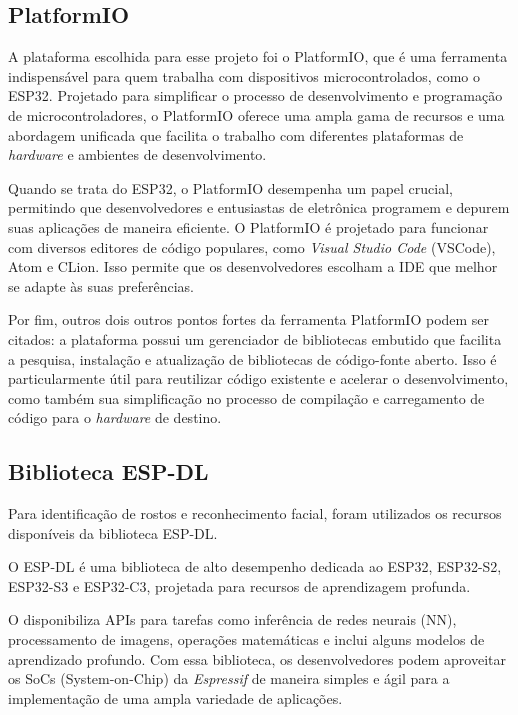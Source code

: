 \subsection{PlatformIO}\label{sec:platformio}

A plataforma escolhida para esse projeto foi o PlatformIO, 
que é uma ferramenta indispensável para quem trabalha com dispositivos 
microcontrolados, como o ESP32. Projetado para simplificar o processo 
de desenvolvimento e programação de microcontroladores, o PlatformIO 
oferece uma ampla gama de recursos e uma abordagem unificada que 
facilita o trabalho com diferentes plataformas de \textit{hardware} e 
ambientes de desenvolvimento.

Quando se trata do ESP32, o PlatformIO desempenha 
um papel crucial, permitindo que desenvolvedores e entusiastas de 
eletrônica programem e depurem suas aplicações de maneira eficiente.
O PlatformIO é projetado para funcionar com diversos editores de 
código populares, como \textit{Visual Studio Code} (VSCode), Atom e CLion. 
Isso permite que os desenvolvedores escolham a IDE que melhor 
se adapte às suas preferências.

Por fim, outros dois outros pontos fortes da ferramenta PlatformIO podem 
ser citados: a plataforma possui um gerenciador de bibliotecas embutido que facilita a 
pesquisa, instalação e atualização de bibliotecas de código-fonte 
aberto. Isso é particularmente útil para reutilizar código 
existente e acelerar o desenvolvimento, como também sua 
simplificação no processo de compilação e carregamento de 
código para o \textit{hardware} de destino. 

\subsection{Biblioteca ESP-DL}\label{sec:formatacaoTexto}

Para identificação de rostos e reconhecimento facial, foram utilizados 
os recursos disponíveis da biblioteca ESP-DL.

O ESP-DL é uma biblioteca de alto desempenho dedicada ao ESP32, ESP32-S2,
ESP32-S3 e ESP32-C3, projetada para recursos de aprendizagem profunda.

O  disponibiliza APIs para tarefas como inferência 
de redes neurais (NN), processamento de imagens, operações matemáticas 
e inclui alguns modelos de aprendizado profundo. Com essa biblioteca, 
os desenvolvedores podem aproveitar os SoCs (System-on-Chip) da 
\textit{Espressif} de maneira simples e ágil para a implementação 
de uma ampla variedade de aplicações.

